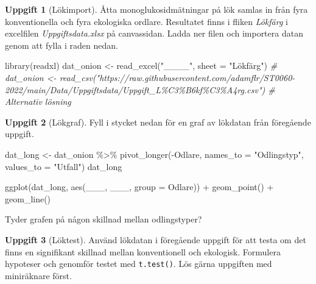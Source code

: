 \documentclass[
]{book}
\newenvironment{Shaded}{\begin{snugshade}}{\end{snugshade}}
\newcommand{\AttributeTok}[1]{\textcolor[rgb]{0.77,0.63,0.00}{#1}}
\newcommand{\CommentTok}[1]{\textcolor[rgb]{0.56,0.35,0.01}{\textit{#1}}}
\newcommand{\FunctionTok}[1]{\textcolor[rgb]{0.00,0.00,0.00}{#1}}
\newcommand{\NormalTok}[1]{#1}
\newcommand{\OtherTok}[1]{\textcolor[rgb]{0.56,0.35,0.01}{#1}}
\newcommand{\SpecialCharTok}[1]{\textcolor[rgb]{0.00,0.00,0.00}{#1}}
\newcommand{\StringTok}[1]{\textcolor[rgb]{0.31,0.60,0.02}{#1}}
\theoremstyle{definition}
\theoremstyle{definition}
\theoremstyle{definition}
\newtheorem{exercise}{Uppgift}[chapter]
\theoremstyle{definition}
\theoremstyle{remark}
\begin{document}
\begin{exercise}[Lökimport]

Åtta monoglukosidmätningar på lök samlas in från fyra konventionella och fyra ekologiska ordlare. Resultatet finns i fliken \emph{Lökfärg} i excelfilen \emph{Uppgiftsdata.xlsx} på canvassidan. Ladda ner filen och importera datan genom att fylla i raden nedan.

\begin{Shaded}
\begin{Highlighting}[]
\FunctionTok{library}\NormalTok{(readxl)}
\NormalTok{dat\_onion }\OtherTok{\textless{}{-}} \FunctionTok{read\_excel}\NormalTok{(}\StringTok{"\_\_\_\_"}\NormalTok{, }\AttributeTok{sheet =} \StringTok{"Lökfärg"}\NormalTok{)}
\CommentTok{\# dat\_onion \textless{}{-} read\_csv("https://raw.githubusercontent.com/adamflr/ST0060{-}2022/main/Data/Uppgiftsdata/Uppgift\_L\%C3\%B6kf\%C3\%A4rg.csv") \# Alternativ lösning}
\end{Highlighting}
\end{Shaded}

\end{exercise}

\begin{exercise}[Lökgraf]
Fyll i stycket nedan för en graf av lökdatan från föregående uppgift.

\begin{Shaded}
\begin{Highlighting}[]
\NormalTok{dat\_long }\OtherTok{\textless{}{-}}\NormalTok{ dat\_onion }\SpecialCharTok{\%\textgreater{}\%} 
  \FunctionTok{pivot\_longer}\NormalTok{(}\SpecialCharTok{{-}}\NormalTok{Odlare, }\AttributeTok{names\_to =} \StringTok{"Odlingstyp"}\NormalTok{, }\AttributeTok{values\_to =} \StringTok{"Utfall"}\NormalTok{)}
\NormalTok{dat\_long}

\FunctionTok{ggplot}\NormalTok{(dat\_long, }\FunctionTok{aes}\NormalTok{(\_\_\_, \_\_\_, }\AttributeTok{group =}\NormalTok{ Odlare)) }\SpecialCharTok{+}
  \FunctionTok{geom\_point}\NormalTok{() }\SpecialCharTok{+}
  \FunctionTok{geom\_line}\NormalTok{()}
\end{Highlighting}
\end{Shaded}

Tyder grafen på någon skillnad mellan odlingstyper?
\end{exercise}

\begin{exercise}[Löktest]
Använd lökdatan i föregående uppgift för att testa om det finns en signifikant skillnad mellan konventionell och ekologisk.
Formulera hypoteser och genomför testet med \texttt{t.test()}. Lös gärna uppgiften med miniräknare först.
\end{exercise}
\end{document}
